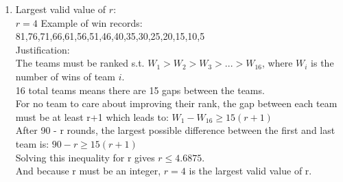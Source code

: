 \documentclass[12pt]{article}
\begin{document}
  
\pagestyle{empty}
 



%
%
%


\begin{enumerate}








\item

{\color{blue}
Largest valid value of $r$:  \\

$r=4$
\vskip1cm
Example of win records: \\

81,76,71,66,61,56,51,46,40,35,30,25,20,15,10,5\\

Justification: \\

The teams must be ranked s.t. $W_1 > W_2 > W_3 > ... > W_{16}$, where $W_i$ is the number of wins of team $i$.  \\
16 total teams means there are 15 gaps between the teams.\\
For no team to care about improving their rank, the gap between each team must be at least r+1 which leads to: 
$W_1 - W_{16} \geq 15(r+1)$\\
After 90 - r rounds, the largest possible difference between the first and last team is: 
$90-r \geq 15(r+1)$\\
Solving this inequality for r gives $r \leq 4.6875$.\\
And because r must be an integer, $r=4$ is the largest valid value of r.\\

}
\end{enumerate}
\end{document}
